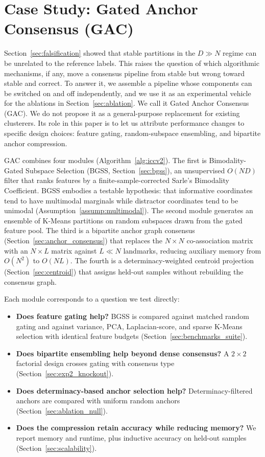 \documentclass[pdflatex,sn-mathphys-num]{sn-jnl}
\theoremstyle{thmstyleone}
\theoremstyle{thmstyletwo}
\theoremstyle{thmstylethree}
\begin{document}
\section{Case Study: Gated Anchor Consensus (GAC)}\label{sec:methodology}\label{sec:methods}

Section~\ref{sec:falsification} showed that stable partitions in the $D \gg N$ regime can be unrelated to the reference labels. This raises the question of which algorithmic mechanisms, if any, move a consensus pipeline from stable but wrong toward stable and correct. To answer it, we assemble a pipeline whose components can be switched on and off independently, and we use it as an experimental vehicle for the ablations in Section~\ref{sec:ablation}. We call it Gated Anchor Consensus (GAC). We do not propose it as a general-purpose replacement for existing clusterers. Its role in this paper is to let us attribute performance changes to specific design choices: feature gating, random-subspace ensembling, and bipartite anchor compression.

GAC combines four modules (Algorithm~\ref{alg:iccv2}). The first is Bimodality-Gated Subspace Selection (BGSS, Section~\ref{sec:bgss}), an unsupervised $O(ND)$ filter that ranks features by a finite-sample-corrected Sarle's Bimodality Coefficient. BGSS embodies a testable hypothesis: that informative coordinates tend to have multimodal marginals while distractor coordinates tend to be unimodal (Assumption~\ref{assump:multimodal}). The second module generates an ensemble of K-Means partitions on random subspaces drawn from the gated feature pool. The third is a bipartite anchor graph consensus (Section~\ref{sec:anchor_consensus}) that replaces the $N \times N$ co-association matrix with an $N \times L$ matrix against $L \ll N$ landmarks, reducing auxiliary memory from $O(N^2)$ to $O(NL)$. The fourth is a determinacy-weighted centroid projection (Section~\ref{sec:centroid}) that assigns held-out samples without rebuilding the consensus graph.

Each module corresponds to a question we test directly:
\begin{itemize}
    \item \textbf{Does feature gating help?} BGSS is compared against matched random gating and against variance, PCA, Laplacian-score, and sparse K-Means selection with identical feature budgets (Section~\ref{sec:benchmarks_suite}).
    \item \textbf{Does bipartite ensembling help beyond dense consensus?} A $2 \times 2$ factorial design crosses gating with consensus type (Section~\ref{sec:exp2_knockout}).
    \item \textbf{Does determinacy-based anchor selection help?} Determinacy-filtered anchors are compared with uniform random anchors (Section~\ref{sec:ablation_null}).
    \item \textbf{Does the compression retain accuracy while reducing memory?} We report memory and runtime, plus inductive accuracy on held-out samples (Section~\ref{sec:scalability}).
\end{itemize}
\end{document}
